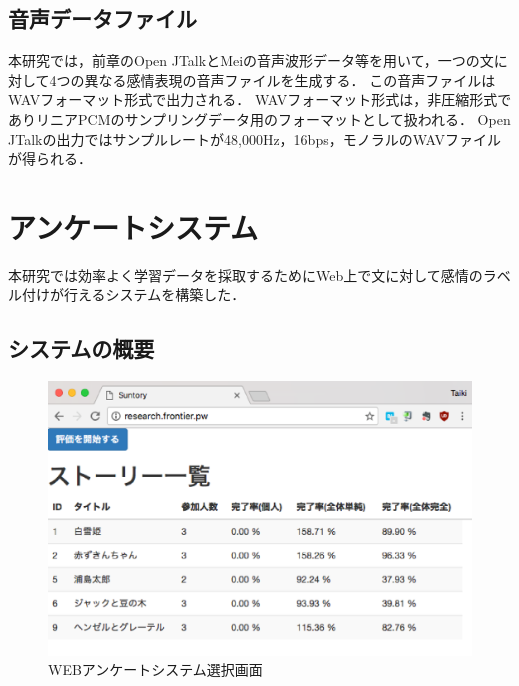 \subsection{音声データファイル}
本研究では，前章のOpen JTalkとMeiの音声波形データ等を用いて，一つの文に対して4つの異なる感情表現の音声ファイルを生成する．
この音声ファイルはWAVフォーマット形式で出力される．
WAVフォーマット形式は，非圧縮形式でありリニアPCMのサンプリングデータ用のフォーマットとして扱われる．
Open JTalkの出力ではサンプルレートが48,000Hz，16bps，モノラルのWAVファイルが得られる．

\section{アンケートシステム}

本研究では効率よく学習データを採取するためにWeb上で文に対して感情のラベル付けが行えるシステムを構築した．

\subsection{システムの概要}
\begin{figure}[h]
  \begin{center}
    \includegraphics[clip,width=13.0cm]{fig/web-index.eps}
    \caption{WEBアンケートシステム選択画面}
    \label{fig:index-web}
  \end{center}
\end{figure}

